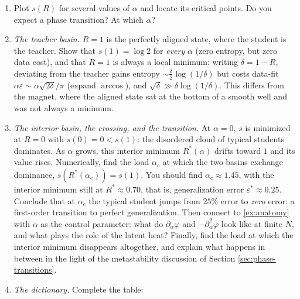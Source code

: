 \documentclass[11pt]{article}
\newcommand{\pd}{\partial}
\begin{document}
\begin{exercise}
\begin{enumerate}
\begin{equation}
    \end{equation}
    This is the exact analogue of the magnet's \eqref{ising-action}: an entropy term counting states, and a ``field'' term rewarding alignment. The aligning field is now the \emph{data}, and its strength is the load $\alpha$. (Averaging $Z$ rather than $\log Z$ is the annealed approximation \eqref{annealed-swap}. It preserves all the qualitative structure here and shifts the numbers only slightly; \cref{app:replica} explains how to do the exact calculation.)
    \item Plot $s(R)$ for several values of $\alpha$ and locate its critical points. Do you expect a phase transition? At which $\alpha$?
    \item \emph{The teacher basin.} $R=1$ is the perfectly aligned state, where the student is the teacher. Show that $s(1) = \log 2$ for \emph{every} $\alpha$ (zero entropy, but zero data cost), and that $R=1$ is always a local minimum: writing $\delta = 1-R$, deviating from the teacher gains entropy $\sim\frac{\delta}{2}\log(1/\delta)$ but costs data-fit $\alpha\varepsilon\sim\alpha\sqrt{2\delta}/\pi$ (expand $\arccos$), and $\sqrt\delta\gg\delta\log(1/\delta)$. This differs from the magnet, where the aligned state sat at the bottom of a smooth well and was not always a minimum.
    \item \emph{The interior basin, the crossing, and the transition.} At $\alpha=0$, $s$ is minimized at $R=0$ with $s(0) = 0 < s(1)$: the disordered cloud of typical students dominates. As $\alpha$ grows, this interior minimum $R^*(\alpha)$ drifts toward $1$ and its value rises. Numerically, find the load $\alpha_c$ at which the two basins exchange dominance, $s(R^*(\alpha_c)) = s(1)$. You should find $\alpha_c\approx 1.45$, with the interior minimum still at $R^*\approx 0.70$, that is, generalization error $\varepsilon^*\approx 0.25$. Conclude that at $\alpha_c$ the typical student jumps from $25\%$ error to \emph{zero} error: a first-order transition to perfect generalization. Then connect to \cref{ex:anatomy} with $\alpha$ as the control parameter: what do $\pd_\alpha\varphi$ and $-\pd_\alpha^2\varphi$ look like at finite $N$, and what plays the role of the latent heat? Finally, find the load at which the interior minimum disappears altogether, and explain what happens in between in the light of the metastability discussion of Section \ref{sec:phase-transitions}.
    \item \emph{The dictionary.} Complete the table:
    \begin{center}

\end{center}
\end{enumerate}
\end{exercise}
\end{document}

